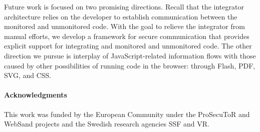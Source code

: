 \documentclass{llncs}
\begin{document}
Future work is focused on two promising directions. Recall that the
integrator architecture relies on the developer to establish
communication between the monitored and unmonitored code. With the
goal to relieve the integrator from manual efforts, we develop a
framework for secure communication that provides explicit support for
integrating and monitored and unmonitored code.
%
The other direction we pursue is interplay of JavaScript-related
information flows with those caused by other possibilities of running
code in the browser: through Flash, PDF, SVG, and CSS.

\paragraph{Acknowledgments}
This work was funded by 
the European Community under the ProSecuToR and WebSand projects
and
the Swedish research agencies SSF and VR.




\end{document}

